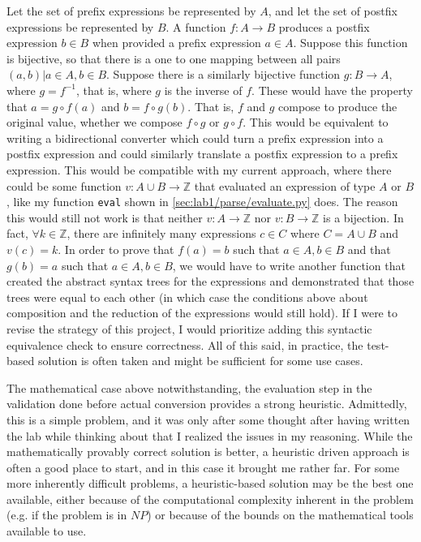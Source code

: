 \documentclass[10pt,letterpaper,final]{report}
\begin{document}
Let the set of prefix expressions be represented by $A$, and let the set of postfix expressions be represented by $B$. A function $f: A \to B$ produces a postfix expression $b \in B$ when provided a prefix expression $a \in A$. Suppose this function is bijective, so that there is a one to one mapping between all pairs $(a,b) | a \in A, b \in B$. Suppose there is a similarly bijective function $g: B \to A$, where $g = f^{-1}$, that is, where $g$ is the inverse of $f$. These would have the property that $a = g \circ f(a)$ and $b = f \circ g(b)$. That is, $f$ and $g$ compose to produce the original value, whether we compose $f \circ g$ or $g \circ f$. This would be equivalent to writing a bidirectional converter which could turn a prefix expression into a postfix expression and could similarly translate a postfix expression to a prefix expression. This would be compatible with my current approach, where there could be some function $v: A \cup B \to \mathbb{Z}$ that evaluated an expression of type $A$ or $B$, like my function \texttt{eval} shown in \autoref{sec:lab1/parse/evaluate.py} does. The reason this would still not work is that neither $v: A \to \mathbb{Z}$ nor $v: B \to \mathbb{Z}$ is a bijection. In fact, $\forall k \in \mathbb{Z}$, there are infinitely many expressions $c \in C$ where $C = A \cup B$ and $v(c) = k$. In order to prove that $f(a) = b$ such that $a \in A, b \in B$ and that $g(b) = a$ such that $a \in A, b \in B$, we would have to write another function that created the abstract syntax trees for the expressions and demonstrated that those trees were equal to each other (in which case the conditions above about composition and the reduction of the expressions would still hold). If I were to revise the strategy of this project, I would prioritize adding this syntactic equivalence check to ensure correctness. All of this said, in practice, the test-based solution is often taken and might be sufficient for some use cases.

The mathematical case above notwithstanding, the evaluation step in the validation done before actual conversion provides a strong heuristic. Admittedly, this is a simple problem, and it was only after some thought after having written the lab while thinking about \textcite{Cheng2022JoyOfAbstraction} that I realized the issues in my reasoning. While the mathematically provably correct solution is better, a heuristic driven approach is often a good place to start, and in this case it brought me rather far. For some more inherently difficult problems, a heuristic-based solution may be the best one available, either because of the computational complexity inherent in the problem (e.g. if the problem is in $NP$) or because of the bounds on the mathematical tools available to use.
\end{document}
